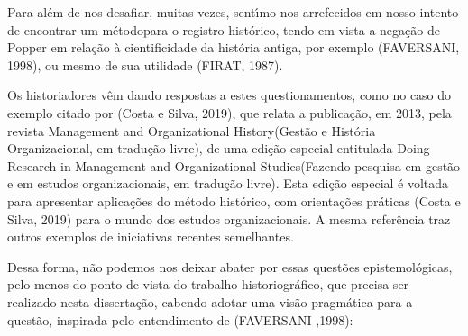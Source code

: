 \documentclass[
12pt,		%
openright,	%
twoside,  %
a4paper,			%
chapter=TITLE,		%
english,			%
french,				%
spanish,			%
brazil				%
]{USPSC-classe/USPSC}
\begin{document}
Para al\'em de nos desafiar, muitas vezes, sent\'{\i}mo-nos arrefecidos em nosso intento de \textquotedbl encontrar um m\'etodo\textquotedbl  para o registro hist\'orico, tendo em vista a nega\c{c}\~ao de Popper em rela\c{c}\~ao \`a cientificidade da hist\'oria antiga, por exemplo (FAVERSANI, 1998), ou mesmo de sua utilidade (FIRAT, 1987).









Os historiadores v\^em dando respostas a estes questionamentos, como no caso do exemplo citado por  (Costa e Silva, 2019), que relata a publica\c{c}\~ao, em 2013, pela revista \textquotedbl Management and Organizational History\textquotedbl  (\textquotedbl Gest\~ao e Hist\'oria Organizacional\textquotedbl , em tradu\c{c}\~ao livre), de uma edi\c{c}\~ao especial entitulada \textquotedbl Doing Research in Management and Organizational Studies\textquotedbl  (Fazendo pesquisa em gest\~ao e em estudos organizacionais\textquotedbl , em tradu\c{c}\~ao livre). Esta edi\c{c}\~ao especial \'e voltada para apresentar aplica\c{c}\~oes do m\'etodo hist\'orico, com orienta\c{c}\~oes pr\'aticas (Costa e Silva, 2019) para o mundo dos estudos organizacionais. A mesma refer\^encia traz outros exemplos de iniciativas recentes semelhantes.









Dessa forma, n\~ao podemos nos deixar abater por essas quest\~oes epistemol\'ogicas, pelo menos do ponto de vista do trabalho historiogr\'afico, que precisa ser realizado nesta disserta\c{c}\~ao, cabendo adotar uma vis\~ao pragm\'atica para a quest\~ao, inspirada pelo entendimento de (FAVERSANI ,1998):










\noindent\begin{center}\mbox{\centering{}}\end{center}
\end{document}
